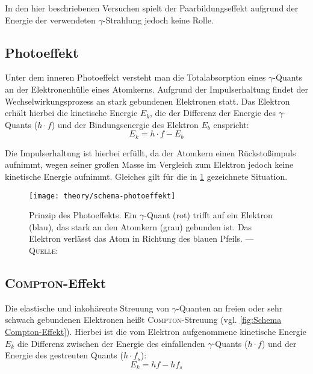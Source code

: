 \documentclass[../protokoll.tex]{subfiles}
\begin{document}
In den hier beschriebenen Versuchen spielt der Paarbildungseffekt aufgrund der
Energie der verwendeten $\gamma$-Strahlung jedoch keine Rolle.

\subsection{Photoeffekt}
Unter dem inneren Photoeffekt versteht man die Totalabsorption eines
$\gamma$-Quants an der Elektronenhülle eines Atomkerns. Aufgrund der 
Impulserhaltung findet der Wechselwirkungsprozess an stark gebundenen Elektronen
statt. Das Elektron erhält hierbei die kinetische Energie $E_k$, die der
Differenz der Energie des $\gamma$-Quants ($h \cdot f$) und der Bindungsenergie
des Elektron $E_b$ enspricht:
\begin{equation}\label{eq:Kinetische Energie Photoeffekt}
    E_k = h \cdot f - E_b
\end{equation}

Die Impulserhaltung ist hierbei erfüllt, da der Atomkern einen Rückstoßimpuls
aufnimmt, wegen seiner großen Masse im Vergleich zum Elektron jedoch keine
kinetische Energie aufnimmt. Gleiches gilt für die in 
\cref{fig:Schema Photoeffekt} gezeichnete Situation.

\begin{figure}[H]
    \centering
    \texttt{[image: theory/schema-photoeffekt]}
    \caption{Prinzip des Photoeffekts. Ein $\gamma$-Quant (rot) trifft auf ein 
    Elektron (blau), das stark an den Atomkern (grau) gebunden ist. Das Elektron
     verlässt das Atom in Richtung des blauen Pfeils. --- 
     \textsc{Quelle}: \cite[S.32, Abb. 3]{script}}
    \label{fig:Schema Photoeffekt}
\end{figure}

\subsection{\textsc{Compton}-Effekt}
Die elastische und inkohärente Streuung von $\gamma$-Quanten an freien oder sehr
schwach gebundenen Elektronen heißt \textsc{Compton}-Streuung 
(vgl. \cref{fig:Schema Compton-Effekt}). Hierbei ist die vom Elektron
aufgenommene kinetische Energie $E_k$ die Differenz zwischen der Energie des
einfallenden $\gamma$-Quants ($h \cdot f$) und der Energie des gestreuten
Quants ($h \cdot f_s$):
\begin{equation}\label{eq:Kinetische Energie Compton}
    E_k = hf - hf_s
\end{equation}
\end{document}
